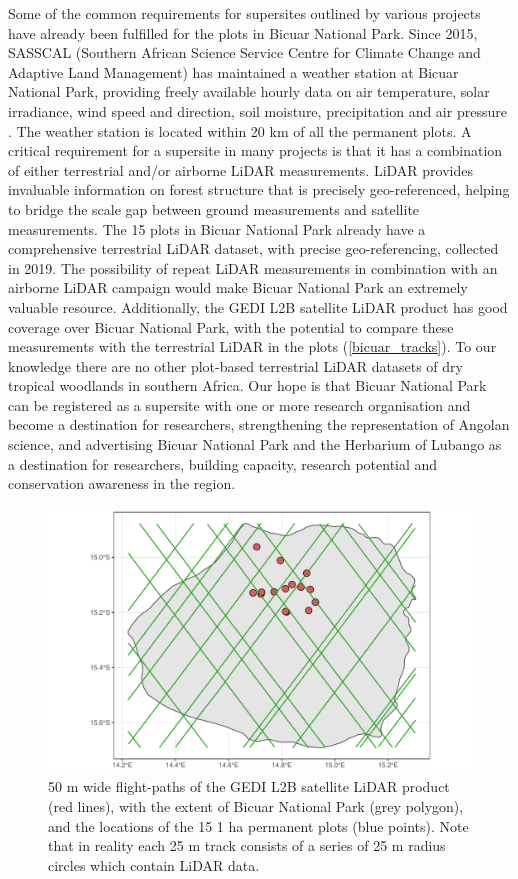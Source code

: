 \begin{refsection}
Some of the common requirements for supersites outlined by various projects have already been fulfilled for the plots in Bicuar National Park. Since 2015, SASSCAL (Southern African Science Service Centre for Climate Change and Adaptive Land Management) has maintained a weather station at Bicuar National Park, providing freely available hourly data on air temperature, solar irradiance, wind speed and direction, soil moisture, precipitation and air pressure \citep{SASSCAL_weather}. The weather station is located within 20 km of all the permanent plots. A critical requirement for a supersite in many projects is that it has a combination of either terrestrial and/or airborne LiDAR measurements. LiDAR provides invaluable information on forest structure that is precisely geo-referenced, helping to bridge the scale gap between ground measurements and satellite measurements. The 15 plots in Bicuar National Park already have a comprehensive terrestrial LiDAR dataset, with precise geo-referencing, collected in 2019. The possibility of repeat LiDAR measurements in combination with an airborne LiDAR campaign would make Bicuar National Park an extremely valuable resource. Additionally, the GEDI L2B satellite LiDAR product has good coverage over Bicuar National Park, with the potential to compare these measurements with the terrestrial LiDAR in the plots (\autoref{bicuar_tracks}). To our knowledge there are no other plot-based terrestrial LiDAR datasets of dry tropical woodlands in southern Africa. Our hope is that Bicuar National Park can be registered as a supersite with one or more research organisation and become a destination for researchers, strengthening the representation of Angolan science, and advertising Bicuar National Park and the Herbarium of Lubango as a destination for researchers, building capacity, research potential and conservation awareness in the region.

\begin{figure}[H]
\centering
	\includegraphics[width=\textwidth]{img/bicuar_tracks}
	\caption{50 m wide flight-paths of the GEDI L2B satellite LiDAR product (red lines), with the extent of Bicuar National Park (grey polygon), and the locations of the 15 1 ha permanent plots (blue points). Note that in reality each 25 m track consists of a series of 25 m radius circles which contain LiDAR data.}
	\label{bicuar_tracks}
\end{figure}


\end{refsection}

